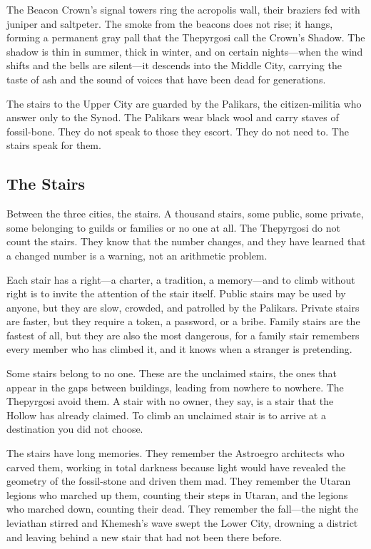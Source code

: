 \documentclass[10pt,twocolumn]{book}
\begin{document}
The Beacon Crown's signal towers ring the acropolis wall, their braziers fed with juniper and saltpeter. The smoke from the beacons does not rise; it hangs, forming a permanent gray pall that the Thepyrgosi call the Crown's Shadow. The shadow is thin in summer, thick in winter, and on certain nights---when the wind shifts and the bells are silent---it descends into the Middle City, carrying the taste of ash and the sound of voices that have been dead for generations.

The stairs to the Upper City are guarded by the Palikars, the citizen-militia who answer only to the Synod. The Palikars wear black wool and carry staves of fossil-bone. They do not speak to those they escort. They do not need to. The stairs speak for them.

\subsection{The Stairs}

Between the three cities, the stairs. A thousand stairs, some public, some private, some belonging to guilds or families or no one at all. The Thepyrgosi do not count the stairs. They know that the number changes, and they have learned that a changed number is a warning, not an arithmetic problem.

Each stair has a right---a charter, a tradition, a memory---and to climb without right is to invite the attention of the stair itself. Public stairs may be used by anyone, but they are slow, crowded, and patrolled by the Palikars. Private stairs are faster, but they require a token, a password, or a bribe. Family stairs are the fastest of all, but they are also the most dangerous, for a family stair remembers every member who has climbed it, and it knows when a stranger is pretending.

Some stairs belong to no one. These are the unclaimed stairs, the ones that appear in the gaps between buildings, leading from nowhere to nowhere. The Thepyrgosi avoid them. A stair with no owner, they say, is a stair that the Hollow has already claimed. To climb an unclaimed stair is to arrive at a destination you did not choose.

The stairs have long memories. They remember the Astroegro architects who carved them, working in total darkness because light would have revealed the geometry of the fossil-stone and driven them mad. They remember the Utaran legions who marched up them, counting their steps in Utaran, and the legions who marched down, counting their dead. They remember the fall---the night the leviathan stirred and Khemesh's wave swept the Lower City, drowning a district and leaving behind a new stair that had not been there before.
\end{document}
